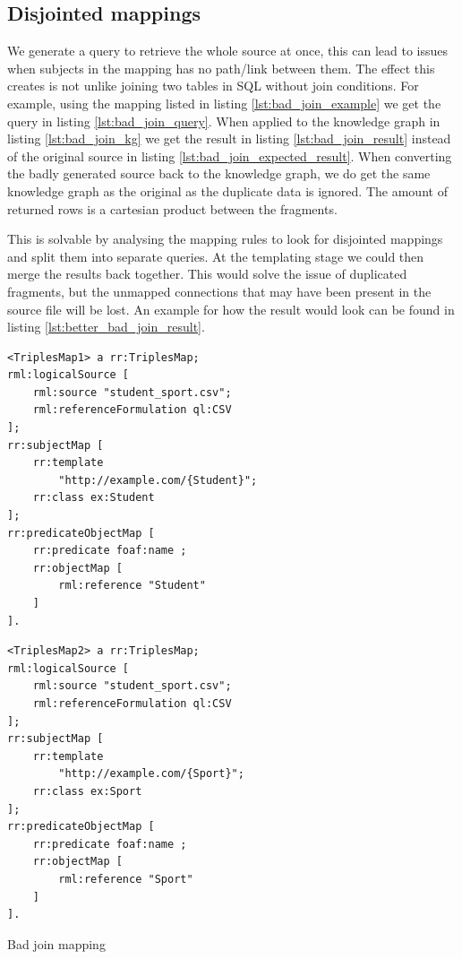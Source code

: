 \subsection{Disjointed mappings}
\label{subsection:disjointed_mappings}

We generate a query to retrieve the whole source at once, this can lead to issues when subjects in the mapping has no path/link between them. The effect this creates is not unlike joining two tables in SQL without join conditions. For example, using the mapping listed in listing \ref{lst:bad_join_example} we get the query in listing \ref{lst:bad_join_query}. When applied to the knowledge graph in listing \ref{lst:bad_join_kg} we get the result in listing \ref{lst:bad_join_result} instead of the original source in listing \ref{lst:bad_join_expected_result}. When converting the badly generated source back to the knowledge graph, we do get the same knowledge graph as the original as the duplicate data is ignored. The amount of returned rows is a cartesian product between the fragments. 

This is solvable by analysing the mapping rules to look for disjointed mappings and split them into separate queries. At the templating stage we could then merge the results back together. This would solve the issue of duplicated fragments, but the unmapped connections that may have been present in the source file will be lost. An example for how the result would look can be found in listing \ref{lst:better_bad_join_result}.

\begin{listing}[!ht]
    \noindent\begin{minipage}[b]{.49\textwidth}
        \begin{lstlisting}[basicstyle=\small, frame=single]
<TriplesMap1> a rr:TriplesMap;
rml:logicalSource [ 
    rml:source "student_sport.csv";
    rml:referenceFormulation ql:CSV
];
rr:subjectMap [ 
    rr:template 
        "http://example.com/{Student}";
    rr:class ex:Student
];
rr:predicateObjectMap [ 
    rr:predicate foaf:name ; 
    rr:objectMap [ 
        rml:reference "Student"
    ]
].
        \end{lstlisting}      
    \end{minipage}
    \hfill
    \begin{minipage}[b]{.47\textwidth}
        \begin{lstlisting}[basicstyle=\small, frame=single]
<TriplesMap2> a rr:TriplesMap;
rml:logicalSource [ 
    rml:source "student_sport.csv";
    rml:referenceFormulation ql:CSV
];
rr:subjectMap [ 
    rr:template 
        "http://example.com/{Sport}";
    rr:class ex:Sport
];
rr:predicateObjectMap [ 
    rr:predicate foaf:name ; 
    rr:objectMap [ 
        rml:reference "Sport"
    ]
].
        \end{lstlisting}
    \end{minipage}
    \addtocounter{listing}{4}
    \caption{Bad join mapping}
    \label{lst:bad_join_example}
\end{listing}

